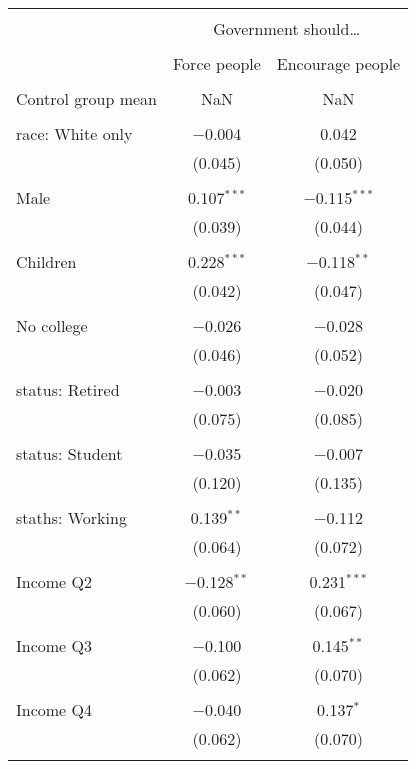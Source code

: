 
\begin{tabular}{@{\extracolsep{5pt}}lcc} 
\\[-1.8ex]\hline 
\hline \\[-1.8ex] 
 & \multicolumn{2}{c}{Government should…} \\ 
\cline{2-3} 
\\[-1.8ex] & Force people & Encourage people \\ 
\hline \\[-1.8ex] 
 Control group mean & NaN & NaN  \\ \hline \\[-1.8ex] race: White only & $-$0.004 & 0.042 \\ 
  & (0.045) & (0.050) \\ 
  & & \\ 
 Male & 0.107$^{***}$ & $-$0.115$^{***}$ \\ 
  & (0.039) & (0.044) \\ 
  & & \\ 
 Children & 0.228$^{***}$ & $-$0.118$^{**}$ \\ 
  & (0.042) & (0.047) \\ 
  & & \\ 
 No college & $-$0.026 & $-$0.028 \\ 
  & (0.046) & (0.052) \\ 
  & & \\ 
 status: Retired & $-$0.003 & $-$0.020 \\ 
  & (0.075) & (0.085) \\ 
  & & \\ 
 status: Student & $-$0.035 & $-$0.007 \\ 
  & (0.120) & (0.135) \\ 
  & & \\ 
 staths: Working & 0.139$^{**}$ & $-$0.112 \\ 
  & (0.064) & (0.072) \\ 
  & & \\ 
 Income Q2 & $-$0.128$^{**}$ & 0.231$^{***}$ \\ 
  & (0.060) & (0.067) \\ 
  & & \\ 
 Income Q3 & $-$0.100 & 0.145$^{**}$ \\ 
  & (0.062) & (0.070) \\ 
  & & \\ 
 Income Q4 & $-$0.040 & 0.137$^{*}$ \\ 
  & (0.062) & (0.070) \\ 
  & & \\ 

\end{tabular}
